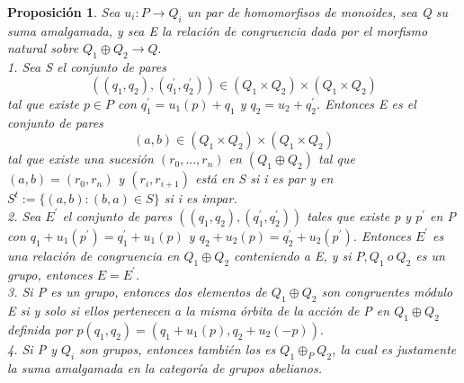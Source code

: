 \documentclass[12pt,spanish]{amsart}
\newtheorem{prop}[Theorem]{Proposición}
\theoremstyle{definition}
\theoremstyle{remark}
\begin{document}
\begin{prop}
 Sea $u_{i}:P \to Q_{i}$ un par de homomorfisos de monoides, sea Q su suma amalgamada, y sea E la relación de congruencia dada por el morfismo natural sobre $Q_{1}\oplus Q_{2}\to Q .$  \\
1. Sea S el conjunto de pares 
$$((q_{1},q_{2}),(q_{1}^{\prime},q_{2}^{\prime}))\in (Q_{1} \times Q_{2})\times (Q_{1}\times Q_{2})$$
tal que existe $p\in P$ con $q_{1}^{\prime}=u_{1}(p)+q_{1}$ y $q_{2}=u_{2}+q_{2}^{\prime}$. Entonces E es el conjunto de pares  
$$(a,b)\in (Q_{1}\times Q_{2}) \times (Q_{1}\times Q_{2})$$
tal que existe una sucesión $(r_{0},...,r_{n})$ en $(Q_{1}\oplus Q_{2})$ tal que $(a,b)=(r_{0},r_{n})$ y $(r_{i},r_{i+1})$ está en S si i es par y en $S^{t}:=\{(a,b):(b,a) \in S\}$ si i es impar. \\
2. Sea $E^{\prime}$ el conjunto de pares $((q_{1},q_{2}),(q_{1}^{\prime},q_{2}^{\prime}))$ tales que existe p y $p^{\prime}$ en P con $q_{1}+u_{1}(p^{\prime})=q_{1}^{\prime}+u_{1}(p)$ y $q_{2}+u_{2}(p)=q_{2}^{\prime}+u_{2}(p^{\prime})$. Entonces $E^{\prime}$ es una relación de congruencia en $Q_{1}\oplus Q_{2}$ conteniendo a E, y si $P,Q_{1}~o~Q_{2}$ es un grupo, entonces $E=E^{\prime}$. \\
3. Si P es un grupo, entonces dos elementos de $Q_{1}\oplus Q_{2}$ son congruentes módulo E si y solo si ellos pertenecen a la misma órbita de la acción de P en $Q_{1}\oplus Q_{2}$ definida por $p(q_{1},q_{2})=(q_{1}+u_{1}(p),q_{2}+u_{2}(-p)).$ \\
4. Si P y $Q_{i}$ son grupos, entonces también los es $Q_{1}\oplus_{P} Q_{2}$, la cual es justamente la suma amalgamada en la categoría de grupos abelianos.
\end{prop}
\end{document}
